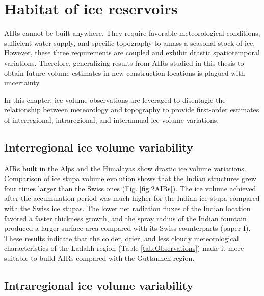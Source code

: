 \chapter{Habitat of ice reservoirs}


\ac{AIRs} cannot be built anywhere. They require favorable meteorological conditions, sufficient water supply,
and specific topography to amass a seasonal stock of ice. However, these three requirements are coupled and
exhibit drastic spatiotemporal variations. Therefore, generalizing results from \ac{AIRs} studied in this thesis to
obtain future volume estimates in new construction locations is plagued with uncertainty.

In this chapter, ice volume observations are leveraged to disentagle the relationship between meteorology
and topography to provide first-order estimates of interregional, intraregional, and interannual ice volume
variations. 

\section{Interregional ice volume variability}

\ac{AIRs} built in the Alps and the Himalayas show drastic ice volume variations. Comparison of ice stupa volume
evolution shows that the Indian structures grew four times larger than the Swiss ones (Fig. \ref{fig:2AIRs}). The
ice volume achieved after the accumulation period was much higher for the Indian ice stupa compared with the Swiss
ice stupas. The lower net radiation fluxes of the Indian location favored a faster thickness growth, and the
spray radius of the Indian fountain produced a larger surface area compared with its Swiss counterparts (paper I).
These results indicate that the colder, drier, and less cloudy meteorological characteristics of the Ladakh
region (Table \ref{tab:Observations}) make it more suitable to build \ac{AIRs} compared with the Guttannen region. 

\section{Intraregional ice volume variability}

